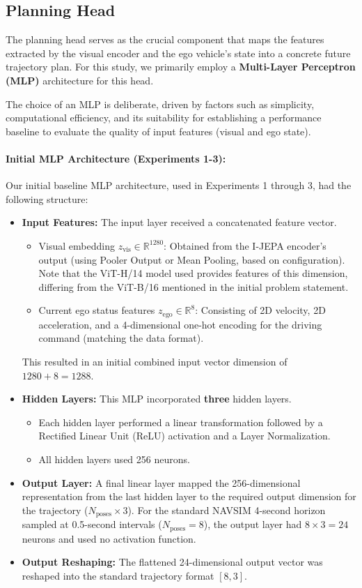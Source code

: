 \documentclass{article}
\begin{document}
\subsection{Planning Head}
\label{subsec:head}
The planning head serves as the crucial component that maps the features extracted by the visual encoder and the ego vehicle's state into a concrete future trajectory plan. For this study, we primarily employ a \textbf{Multi-Layer Perceptron (MLP)} architecture for this head.

The choice of an MLP is deliberate, driven by factors such as simplicity, computational efficiency, and its suitability for establishing a performance baseline to evaluate the quality of input features (visual and ego state).

\paragraph{Initial MLP Architecture (Experiments 1-3):}
Our initial baseline MLP architecture, used in Experiments 1 through 3, had the following structure:
\begin{itemize}
    \item \textbf{Input Features:} The input layer received a concatenated feature vector.
        \begin{itemize}
            \item Visual embedding $z_{\text{vis}} \in \mathbb{R}^{1280}$: Obtained from the I-JEPA encoder's output (using Pooler Output or Mean Pooling, based on configuration). Note that the ViT-H/14 model used provides features of this dimension, differing from the ViT-B/16 mentioned in the initial problem statement.
            \item Current ego status features $z_{\text{ego}} \in \mathbb{R}^{8}$: Consisting of 2D velocity, 2D acceleration, and a 4-dimensional one-hot encoding for the driving command (matching the data format).
        \end{itemize}
    This resulted in an initial combined input vector dimension of $1280 + 8 = 1288$.
    \item \textbf{Hidden Layers:} This MLP incorporated \textbf{three} hidden layers.
        \begin{itemize}
            \item Each hidden layer performed a linear transformation followed by a Rectified Linear Unit (ReLU) activation and a Layer Normalization.
            \item All hidden layers used 256 neurons.
        \end{itemize}
    \item \textbf{Output Layer:} A final linear layer mapped the 256-dimensional representation from the last hidden layer to the required output dimension for the trajectory ($N_{\text{poses}} \times 3$). For the standard NAVSIM 4-second horizon sampled at 0.5-second intervals ($N_{\text{poses}} = 8$), the output layer had $8 \times 3 = 24$ neurons and used no activation function.
    \item \textbf{Output Reshaping:} The flattened 24-dimensional output vector was reshaped into the standard trajectory format $[8, 3]$.
\end{itemize}
\end{document}
